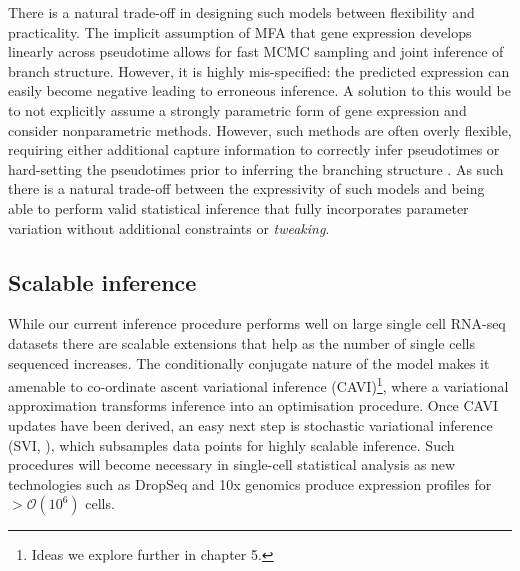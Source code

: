 There is a natural trade-off in designing such models between flexibility and practicality. The implicit assumption of MFA that gene expression develops linearly across pseudotime allows for fast MCMC sampling and joint inference of branch structure. However, it is highly mis-specified: the predicted expression can easily become negative leading to erroneous inference. A solution to this would be to not explicitly assume a strongly parametric form of gene expression and consider nonparametric methods. However, such methods are often overly flexible, requiring either additional capture information to correctly infer pseudotimes \cite{Reid2016-yo} or hard-setting the pseudotimes prior to inferring the branching structure \cite{lonnberg2016temporal}. As such there is a natural trade-off between the expressivity of such models and being able to perform valid statistical inference that fully incorporates parameter variation without additional constraints or
 \emph{tweaking}.




\subsection{Scalable inference}

While our current inference procedure performs well on large single cell RNA-seq datasets there are scalable extensions that help as the number of single cells sequenced increases. The conditionally conjugate nature of the model makes it amenable to co-ordinate ascent variational inference (CAVI)\footnote{Ideas we explore further in chapter 5.}, where a variational approximation transforms inference into an optimisation procedure. Once CAVI updates have been derived, an easy next step is   stochastic variational inference (SVI, \cite{hoffman2013stochastic}), which subsamples data points for highly scalable inference. Such procedures will become necessary in single-cell statistical analysis as new technologies such as DropSeq \cite{Macosko2015-ek}
and 10x genomics \cite{eisenstein2015startups} produce expression profiles for $>\mathcal{O}(10^6)$ cells.

